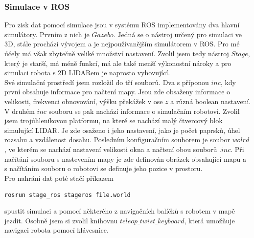 \documentclass[12pt]{article}
\begin{document}
\subsubsection{Simulace v ROS}
Pro zisk dat pomocí simulace jsou v systému ROS implementovány dva hlavní simulátory. Prvním z nich je $Gazebo$. Jedná se o nástroj určený pro simulaci ve 3D, stále prochází vývojem a je nejpoužívanějším simulátorem v ROS. Pro mé účely má však zbytečně veliké množství nastavení. Zvolil jsem tedy nástroj $Stage$, který je starší, má méně funkcí, má ale také menší výkonostní nároky a pro simulaci robota s 2D LIDARem je naprosto vyhovující.\\
\indent Své simulační prostředí jsem rozložil do tří souborů. Dva s příponou $inc$, kdy první obsahuje informace pro načtení mapy. Jsou zde obsaženy informace o velikosti, frekvenci obnovování, výšku překážek v ose $z$ a různá boolean nastavení. V druhém $inc$ souboru se pak nachází informace o simulačním robotovi. Zvolil jsem trojúhleníkovou platformu, na které se nachází malý čtvercový blok simulující LIDAR. Je zde osaženo i jeho nastavení, jako je počet paprsků, úhel rozsahu a vzdálenost dosahu. Posledním konfiguračním souborem je soubor $wolrd$, ve kterém se nachází nastavení velikosti okna a načtení obou souborů $.inc$. Při načítání souboru s nastevením mapy je zde definován obrázek obsahující mapu a s načítáním souboru o robotovi se definuje jeho pozice v prostoru.\\
\indent Pro nahrání dat poté stačí příkazem
\begin{center}
	\texttt{rosrun stage\_ros stageros file.world}
\end{center}
spustit simulaci a pomocí některého z navigačních balíčků s robotem v mapě jezdit. Osobně jsem si zvolil knihovnu $teleop\_twist\_keyboard$, která umožňuje navigaci robota pomocí klávesnice.
\end{document}
